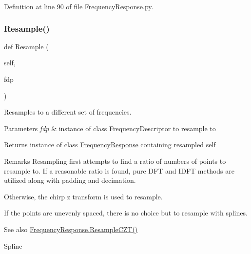 Definition at line 90 of file Frequency\+Response.\+py.

\mbox{\label{classSignalIntegrity_1_1FrequencyDomain_1_1FrequencyResponse_1_1FrequencyResponse_a6aa7e8bdecb4f17e41d783d00a27fdd8}} 
\subsubsection{\texorpdfstring{Resample()}{Resample()}}
{\footnotesize\ttfamily def Resample (\begin{DoxyParamCaption}\item[{}]{self,  }\item[{}]{fdp }\end{DoxyParamCaption})}



Resamples to a different set of frequencies. 


\begin{DoxyParams}{Parameters}
{\em fdp} & instance of class Frequency\+Descriptor to resample to \\
\hline
\end{DoxyParams}
\begin{DoxyReturn}{Returns}
instance of class \hyperlink{classSignalIntegrity_1_1FrequencyDomain_1_1FrequencyResponse_1_1FrequencyResponse}{Frequency\+Response} containing resampled self 
\end{DoxyReturn}
\begin{DoxyRemark}{Remarks}
Resampling first attempts to find a ratio of numbers of points to resample to. If a reasonable ratio is found, pure D\+FT and I\+D\+FT methods are utilized along with padding and decimation.
\end{DoxyRemark}
Otherwise, the chirp z transform is used to resample.

If the points are unevenly spaced, there is no choice but to resample with splines.

\begin{DoxySeeAlso}{See also}
\hyperlink{classSignalIntegrity_1_1FrequencyDomain_1_1FrequencyResponse_1_1FrequencyResponse_af61ffacaaef319b5b0752778bfe522e6}{Frequency\+Response.\+Resample\+C\+Z\+T()} 

Spline 
\end{DoxySeeAlso}


